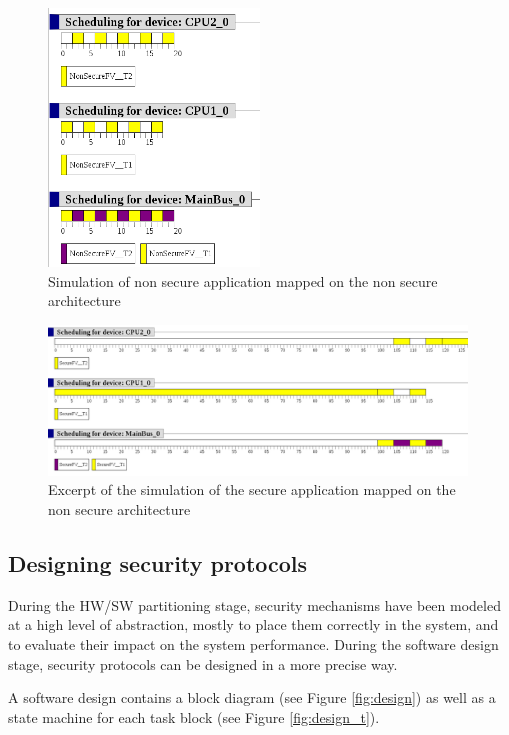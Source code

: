 \documentclass[12pt]{article}
\begin{document}
\begin{figure}[htbp]
\centering
\includegraphics[width=0.5\textwidth]{fig/simu_mapping1}
\caption{Simulation of non secure application mapped on the non secure architecture} \label{fig:simu_mapping1}
\end{figure}

\begin{figure}[htbp]
\centering
\includegraphics[width=0.99\textwidth]{fig/simu_mapping3}
\caption{Excerpt of the simulation of the secure application mapped on the non secure architecture} \label{fig:simu_mapping3}
\end{figure}

\subsection{Designing security protocols}
During the HW/SW partitioning stage, security mechanisms have been modeled at a high level of abstraction, mostly to place them correctly in the system, and to evaluate their impact on the system performance. During the software design stage, security protocols can be designed in a more precise way.

A software design contains a block diagram (see Figure \ref{fig:design}) as well as a state machine for each task block (see Figure \ref{fig:design_t}). 
\end{document}

